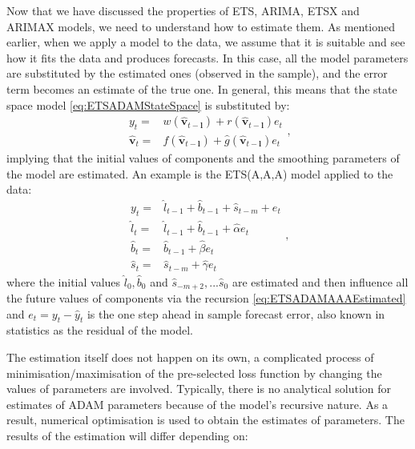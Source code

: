 \documentclass[]{book}
\theoremstyle{definition}
\theoremstyle{definition}
\theoremstyle{definition}
\theoremstyle{definition}
\theoremstyle{remark}
\begin{document}
Now that we have discussed the properties of ETS, ARIMA, ETSX and ARIMAX models, we need to understand how to estimate them. As mentioned earlier, when we apply a model to the data, we assume that it is suitable and see how it fits the data and produces forecasts. In this case, all the model parameters are substituted by the estimated ones (observed in the sample), and the error term becomes an estimate of the true one. In general, this means that the state space model \eqref{eq:ETSADAMStateSpace} is substituted by:
\begin{equation}
  \begin{aligned}
    {y}_{t} = &w(\hat{\mathbf{v}}_{t-\mathbf{l}}) + r(\hat{\mathbf{v}}_{t-\mathbf{l}}) e_t \\
    \hat{\mathbf{v}}_{t} = &f(\hat{\mathbf{v}}_{t-\mathbf{l}}) + \hat{g}(\hat{\mathbf{v}}_{t-\mathbf{l}}) e_t
  \end{aligned},
  \label{eq:ETSADAMStateSpaceEstimatedAgain}
\end{equation}
implying that the initial values of components and the smoothing parameters of the model are estimated. An example is the ETS(A,A,A) model applied to the data:
\begin{equation}
  \begin{aligned}
    y_{t} = & \hat{l}_{t-1} + \hat{b}_{t-1} + \hat{s}_{t-m} + e_t \\
    \hat{l}_t = & \hat{l}_{t-1} + \hat{b}_{t-1} + \hat{\alpha} e_t \\
    \hat{b}_t = & \hat{b}_{t-1} + \hat{\beta} e_t \\
    \hat{s}_t = & \hat{s}_{t-m} + \hat{\gamma} e_t 
  \end{aligned},
  \label{eq:ETSADAMAAAEstimated}
\end{equation}
where the initial values \(\hat{l}_0, \hat{b}_0\) and \(\hat{s}_{-m+2}, ... \hat{s}_0\) are estimated and then influence all the future values of components via the recursion \eqref{eq:ETSADAMAAAEstimated} and \(e_t = y_t -\hat{y}_t\) is the one step ahead in sample forecast error, also known in statistics as the residual of the model.

The estimation itself does not happen on its own, a complicated process of minimisation/maximisation of the pre-selected loss function by changing the values of parameters are involved. Typically, there is no analytical solution for estimates of ADAM parameters because of the model's recursive nature. As a result, numerical optimisation is used to obtain the estimates of parameters. The results of the estimation will differ depending on:
\end{document}

